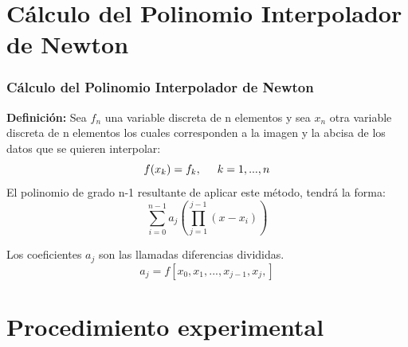\documentclass{beamer}
\begin{document}
\section{Cálculo del Polinomio Interpolador de Newton}

\begin{frame}

\frametitle{Cálculo del Polinomio Interpolador de Newton}
\textbf{Definición:} Sea $f_{n}$  una variable discreta de n  elementos y sea $x_{n}$ otra variable discreta de n elementos los cuales corresponden a la imagen y la abcisa de los datos que se quieren interpolar:
  \[f(x_{k})=f_{k}, \hspace{0.5 cm} k=1,...,n\]
El polinomio de grado n-1  resultante de aplicar este método, tendrá la forma:
\[\sum_{i=0}^{n-1} {a_j}(\prod_{j=1}^{j-1}{(x-x_{i})})\]
\end{frame}
\begin{frame}
Los coeficientes $a_{j}$ son las llamadas diferencias divididas.
\[ a_{j}=f[x_{0},x_{1},...,x_{j-1},x_{j},]\]
\end{frame}
\section{Procedimiento experimental}
\end{document}
